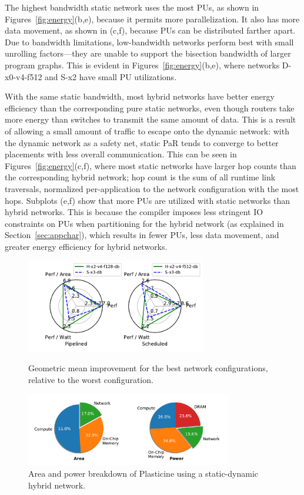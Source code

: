 The highest bandwidth static network uses the most PUs, as shown in Figures~\ref{fig:energy}(b,e), because it permits more parallelization. 
It also has more data movement, as shown in (c,f), because PUs can be distributed farther apart. 
Due to bandwidth limitations, low-bandwidth networks perform best with small unrolling factors---they are unable to support the bisection bandwidth of larger program graphs.
This is evident in Figures~\ref{fig:energy}(b,e), where networks D-x0-v4-f512 and S-x2 have small PU utilizations.

With the same static bandwidth, most hybrid networks have better energy efficiency than the corresponding pure static networks, even though routers take more energy than switches to transmit the same amount of data.
This is a result of allowing a small amount of traffic to escape onto the dynamic network: with the dynamic network as a safety net, static PaR tends to converge to better placements with less overall communication.
This can be seen in Figures~\ref{fig:energy}(c,f), where most static networks have larger hop counts than the corresponding hybrid network; hop count is the sum of all runtime link traversals, normalized per-application to the network configuration with the most hops.
Subplots (e,f) show that more PUs are utilized with static networks than hybrid networks.
This is because the compiler imposes less stringent IO constraints on PUs when partitioning for the
hybrid network (as explained in Section~\ref{sec:appchar}), which results in fewer PUs, less data movement, and greater energy efficiency for hybrid networks.

\begin{figure}
  \centering
\includegraphics[width=0.7\textwidth]{network/figs/radar_best.pdf}
  \caption[Best newtork configurations]{Geometric mean improvement for the best network configurations, relative to the worst configuration.}\label{fig:radar_best}
\centering
\includegraphics[width=0.8\textwidth]{figs/pie.pdf}
\caption[Area and power breakdown of Plasticine]{
  Area and power breakdown of Plasticine using a static-dynamic hybrid network.
}
\label{fig:breakdown}
\end{figure}

